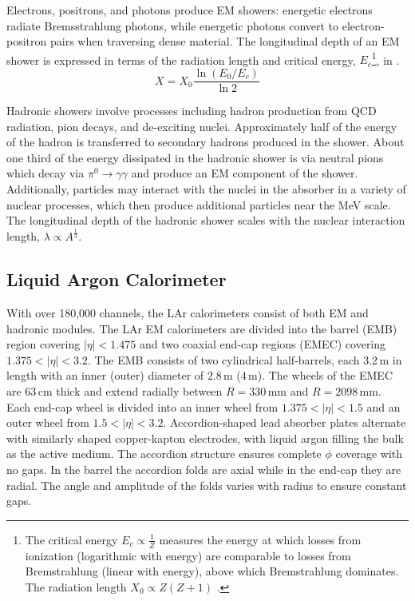 Electrons, positrons, and photons produce EM showers: energetic electrons radiate Bremsstrahlung photons, while energetic photons convert to electron-positron pairs when traversing dense material. The longitudinal depth of an EM shower is expressed in terms of the radiation length and critical energy, $E_c$\footnote{
	The critical energy $E_c\propto \frac{1}{Z}$ measures the energy at which losses from ionization (logarithmic with energy) are comparable to losses from Bremstrahlung (linear with energy), above which Bremstrahlung dominates. The radiation length $X_0\propto Z(Z+1)$ \cite{pdg_2017}. 
}, in \Eqn{\ref{eq:x0}}.
\begin{equation}
	X = X_0\frac{\ln\left(E_0/E_c\right)}{\ln 2}
	\label{eq:x0}
\end{equation}

Hadronic showers involve processes including hadron production from QCD radiation, pion decays, and de-exciting nuclei. Approximately half of the energy of the hadron is transferred to secondary hadrons produced in the shower. About one third of the energy dissipated in the hadronic shower is via neutral pions which decay via $\pi^0\to\gamma\gamma$ and produce an EM component of the shower. Additionally, particles may interact with the nuclei in the absorber in a variety of nuclear processes, which then produce additional particles near the MeV scale.  The longitudinal depth of the hadronic shower scales with the nuclear interaction length, $\lambda\propto A^{\frac{1}{3}}$. 


%
\subsection{Liquid Argon Calorimeter}

With over 180,000 channels, the LAr calorimeters consist of both EM and hadronic modules. The LAr EM calorimeters are divided into the barrel (EMB) region covering $|\eta|<1.475$ and two coaxial end-cap regions (EMEC) covering $1.375<|\eta|<3.2$. The EMB consists of two cylindrical half-barrels, each 3.2\,m in length with an inner (outer) diameter of $2.8$\,m ($4$\,m). The wheels of the EMEC are 63\,cm thick and extend radially between $R=330$\,mm and $R=2098$\,mm.  Each end-cap wheel is divided into an inner wheel from $1.375<|\eta|<1.5$ and an outer wheel from $1.5<|\eta|<3.2$. Accordion-shaped lead absorber plates alternate with similarly shaped copper-kapton electrodes, with liquid argon filling the bulk as the active medium. The accordion structure ensures complete $\phi$ coverage with no gaps. In the barrel the accordion folds are axial while in the end-cap they are radial. The angle and amplitude of the folds varies with radius to ensure constant gaps.

